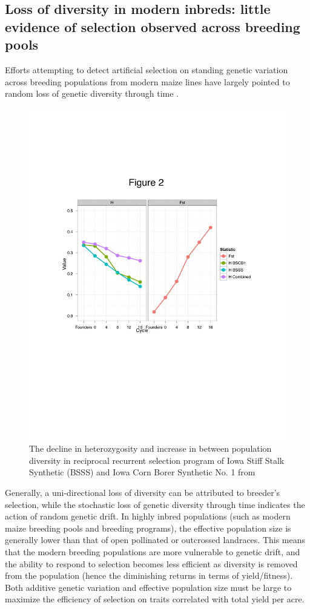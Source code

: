 \documentclass[12pt]{article}
\begin{document}
\subsection*{Loss of diversity in modern inbreds: little evidence of selection observed across breeding pools}
 Efforts attempting to detect artificial selection on standing genetic variation across breeding populations from modern maize lines have largely pointed to random loss of genetic diversity through time \citep{Gerke:2013tw}\citep{vanHeerwaarden:2012im}. 

\begin{figure}[ht]
\includegraphics[width=1.0\linewidth]{justin_het_fst.pdf}
\caption{The decline in heterozygosity and increase in between population diversity in reciprocal recurrent selection program of Iowa Stiff Stalk Synthetic (BSSS) and Iowa Corn Borer Synthetic No. 1 from \citep{Gerke:2013tw}} 
\end{figure}


Generally, a uni-directional loss of diversity can be attributed to breeder's selection, while the stochastic loss of genetic diversity through time indicates the action of random genetic drift. In highly inbred populations (such as modern maize breeding pools and breeding programs), the effective population size is generally lower than that of open pollinated or outcrossed landraces. This means that the modern breeding populations are more vulnerable to genetic drift, and the ability to respond to selection becomes less efficient as diversity is removed from the population (hence the diminishing returns in terms of yield/fitness). Both additive genetic variation and effective population size must be large to maximize the efficiency of selection on traits correlated with total yield per acre.
\end{document}
